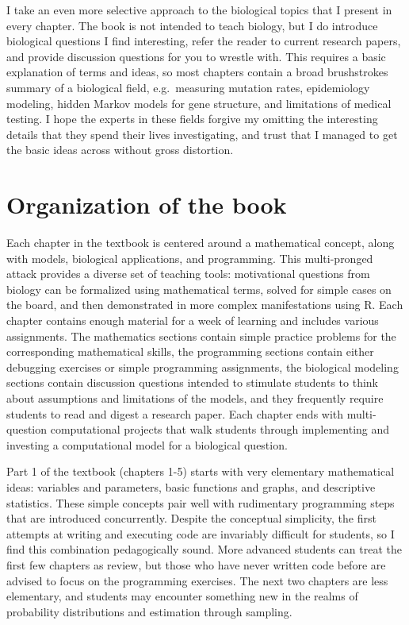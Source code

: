 \documentclass[
]{book}
\begin{document}
I take an even more selective approach to the biological topics that I present in every chapter. The book is not intended to teach biology, but I do introduce biological questions I find interesting, refer the reader to current research papers, and provide discussion questions for you to wrestle with. This requires a basic explanation of terms and ideas, so most chapters contain a broad brushstrokes summary of a biological field, e.g.~measuring mutation rates, epidemiology modeling, hidden Markov models for gene structure, and limitations of medical testing. I hope the experts in these fields forgive my omitting the interesting details that they spend their lives investigating, and trust that I managed to get the basic ideas across without gross distortion.

\hypertarget{organization-of-the-book}{%
\section{Organization of the book}\label{organization-of-the-book}}

Each chapter in the textbook is centered around a mathematical concept, along with models, biological applications, and programming. This multi-pronged attack provides a diverse set of teaching tools: motivational questions from biology can be formalized using mathematical terms, solved for simple cases on the board, and then demonstrated in more complex manifestations using R. Each chapter contains enough material for a week of learning and includes various assignments. The mathematics sections contain simple practice problems for the corresponding mathematical skills, the programming sections contain either debugging exercises or simple programming assignments, the biological modeling sections contain discussion questions intended to stimulate students to think about assumptions and limitations of the models, and they frequently require students to read and digest a research paper. Each chapter ends with multi-question computational projects that walk students through implementing and investing a computational model for a biological question.

Part 1 of the textbook (chapters 1-5) starts with very elementary mathematical ideas: variables and parameters, basic functions and graphs, and descriptive statistics. These simple concepts pair well with rudimentary programming steps that are introduced concurrently. Despite the conceptual simplicity, the first attempts at writing and executing code are invariably difficult for students, so I find this combination pedagogically sound. More advanced students can treat the first few chapters as review, but those who have never written code before are advised to focus on the programming exercises. The next two chapters are less elementary, and students may encounter something new in the realms of probability distributions and estimation through sampling.
\end{document}
